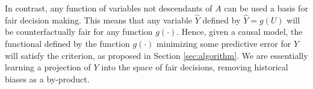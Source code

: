 In contrast, any function of variables not descendants of $A$ can be
used a basis for fair decision making. This means that any variable
$\hat Y$ defined by $\hat Y = g(U)$ will be counterfactually fair for
any function $g(\cdot)$. Hence, given a causal model, the functional
defined by the function $g(\cdot)$ minimizing some predictive error
for $Y$ will satisfy the criterion, as proposed in Section
\ref{sec:algorithm}. We are essentially learning a projection of $Y$
into the space of fair decisions, removing historical biases as a
by-product.



